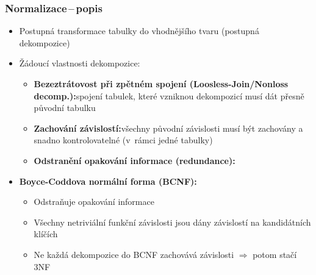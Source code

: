 \documentclass[a4paper,10pt]{article}
\newcommand{\pojem}[2]{\item \textbf{#1:}\quad #2}
\newcommand{\tedy}{$\Rightarrow$ }
\begin{document}
			\subsubsection{Normalizace\,--\,popis}
				\begin{itemize}
					\item Postupná transformace tabulky do vhodnějšího tvaru (postupná dekompozice)
					\item Žádoucí vlastnosti dekompozice:
					\begin{itemize}
						\pojem{Bezeztrátovost při zpětném spojení (Loosless-Join/Nonloss decomp.)}{spojení tabulek, které vzniknou dekompozicí musí dát přesně původní tabulku}
						\pojem{Zachování závislostí}{všechny původní závislosti musí být zachovány a snadno kontrolovatelné (v~rámci jedné tabulky)}
						\pojem{Odstranění opakování informace (redundance)}
					\end{itemize}
					\pojem{Boyce-Coddova normální forma (BCNF)}
					\begin{itemize}
						\item Odstraňuje opakování informace
						\item Všechny netriviální funkční závislosti jsou dány závislostí na kandidátních klíčích
						\item Ne každá dekompozice do BCNF zachovává závislosti \tedy potom stačí 3NF
					\end{itemize}
				\end{itemize}
\end{document}
